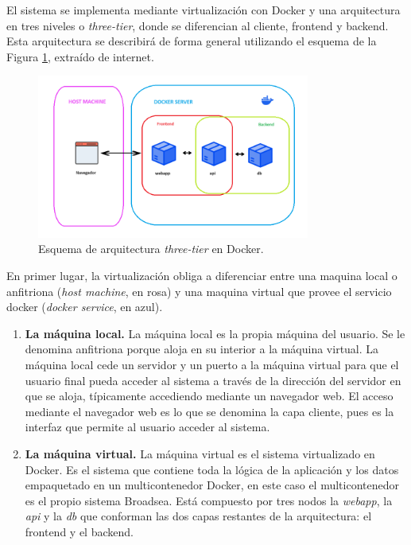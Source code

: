 {El sistema se implementa mediante virtualización con Docker y una arquitectura en tres niveles o \textit{three-tier}, donde se diferencian al cliente, frontend y backend. Esta arquitectura se describirá de forma general utilizando el esquema de la Figura \ref{fig:threeTierValle}, extraído de internet.

\begin{figure}[H]
    \centering
    \includegraphics[width=0.80\textwidth]{figures/threeTierValle.png}
    \caption{Esquema de arquitectura \textit{three-tier} en Docker.}
    \label{fig:threeTierValle}
\end{figure}

En primer lugar, la virtualización obliga a diferenciar entre una maquina local o anfitriona (\textit{host machine}, en rosa) y una maquina virtual que provee el servicio docker (\textit{docker service}, en azul). 

\begin{enumerate}

    \item \textbf{La máquina local.} La máquina local es la propia máquina del usuario. Se le denomina anfitriona porque aloja en su interior a la máquina virtual. La máquina local cede un servidor y un puerto a la máquina virtual para que el usuario final pueda acceder al sistema a través de la dirección del servidor en que se aloja, típicamente accediendo mediante un navegador web. El acceso mediante el navegador web es lo que se denomina la capa cliente, pues es la interfaz que permite al usuario acceder al sistema. 

    \item \textbf{La máquina virtual.} La máquina virtual es el sistema virtualizado en Docker. Es el sistema que contiene toda la lógica de la aplicación y los datos empaquetado en un multicontenedor Docker, en este caso el multicontenedor es el propio sistema Broadsea. Está compuesto por tres nodos la \textit{webapp}, la \textit{api} y la \textit{db} que conforman las dos capas restantes de la arquitectura: el frontend y el backend.
    

\end{enumerate}}
